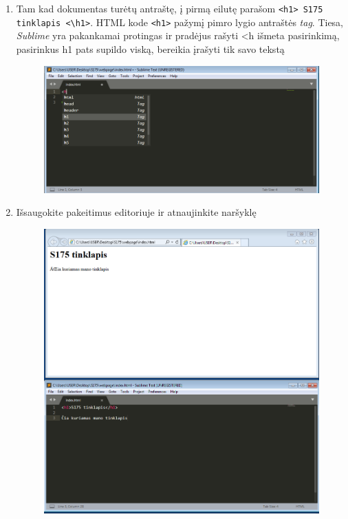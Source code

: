 \documentclass[11pt,a4paper]{article}
\begin{document}
\begin{enumerate}
\item Tam kad dokumentas turėtų antraštę, į pirmą eilutę parašom \colorbox{listinggray}{\lstinline|<h1> S175 tinklapis <\h1>|}. HTML kode \colorbox{listinggray}{\lstinline|<h1>|} pažymį pimro lygio antraštės \textit{tag}. Tiesa, \textit{Sublime} yra pakankamai protingas ir pradėjus rašyti <h išmeta pasirinkimą, pasirinkus h1 pats supildo viską, bereikia įrašyti tik savo tekstą
\begin{figure}[ht]
\center
\includegraphics[scale=0.3]{webpage_2.png}
\end{figure}

\item Išsaugokite pakeitimus editoriuje ir atnaujinkite naršyklę

\begin{figure}[ht]
\center
\includegraphics[scale=0.3]{webpage_3.png}
\end{figure}


\end{enumerate}
\end{document}
